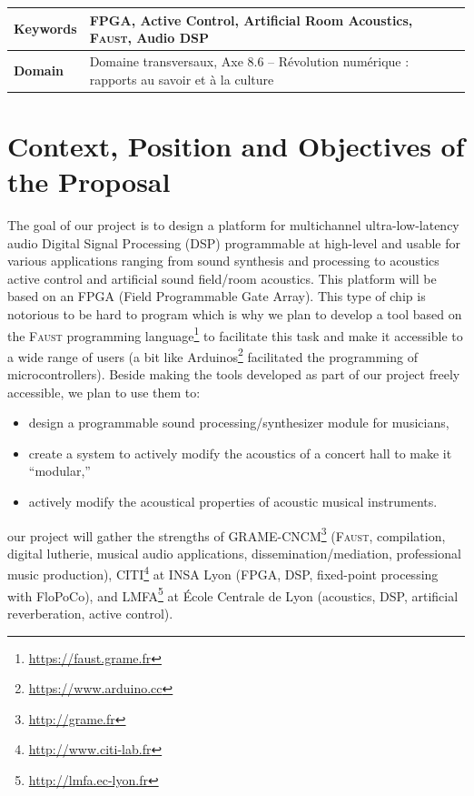\documentclass[a4paper,10pt]{article}
\author{Coordinator: Romain Michon\\
\small GRAME-CNCM, Lyon.
}
\title{\vspace{-\baselineskip}\mytitle}
\date{Domaine transversaux\\
Axe 8.6 -- Révolution numérique : rapports au savoir et à la culture}
\newcommand{\F}{\textsc{Faust}}
\newcommand{\PP}{our project}
\begin{document}
\maketitle
\thispagestyle{fancy}



\begin{tabular}{p{2.3cm} p{12cm}}
  \hline
  \textbf{Keywords} & FPGA, Active Control, Artificial Room Acoustics, \F{}, Audio DSP \\\hline
  \textbf{Domain} & Domaine transversaux, Axe 8.6 -- Révolution numérique : rapports au savoir et à la culture
  \\\hline
\end{tabular}

\section*{Context, Position and Objectives of the Proposal}

The goal of \PP{} is to design a platform for multichannel ultra-low-latency audio Digital Signal Processing (DSP) programmable at high-level and usable for various applications ranging from sound synthesis and processing to acoustics active control and artificial sound field/room acoustics. This platform will be based on an FPGA (Field Programmable Gate Array). This type of chip is notorious to be hard to program which is why we plan to develop a tool based on the \F{} programming language\footnote{\url{https://faust.grame.fr}} to facilitate this task and make it accessible to a wide range of users (a bit like Arduinos\footnote{\url{https://www.arduino.cc}} facilitated the programming of microcontrollers). Beside making the tools developed as part of \PP{} freely accessible, we plan to use them to:
\begin{itemize}
  \itemsep0em
  \item design a programmable sound processing/synthesizer module for musicians, 
  \item create a system to actively modify the acoustics of a concert hall to make it ``modular,''
  \item actively modify the acoustical properties of acoustic musical instruments. 
\end{itemize}
\PP{} will gather the strengths of GRAME-CNCM\footnote{\url{http://grame.fr}} (\F{}, compilation, digital lutherie, musical audio applications, dissemination/mediation, professional music production), CITI\footnote{\url{http://www.citi-lab.fr}} at INSA Lyon (FPGA, DSP, fixed-point processing with FloPoCo), and LMFA\footnote{\url{http://lmfa.ec-lyon.fr}} at École Centrale de Lyon (acoustics, DSP, artificial reverberation, active control).
\end{document}
